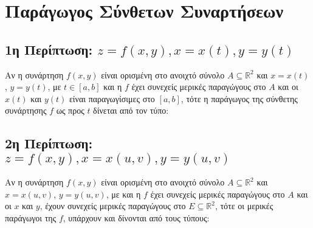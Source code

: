 \chapter{Παράγωγος Σύνθετων Συναρτήσεων}

\section{1η Περίπτωση: \ensuremath{z=f(x,y),  x=x(t),  y=y(t)}} 

\begin{thm}
  Αν η συνάρτηση $ f(x,y) $ είναι ορισμένη στο ανοιχτό σύνολο 
  $ A \subseteq \mathbb{R}^{2} $ και $ x = x(t) $, $ y=y(t) $, με 
  $ t \in [a,b] $ και η $f$ έχει συνεχείς μερικές 
  παραγώγους στο $A$ και οι $ x(t) $ και $ y(t) $ είναι παραγωγίσιμες στο 
  $ [a,b] $, τότε η παράγωγος της σύνθετης συνάρτησης $f$ ως προς $t$ δίνεται από 
  τον τύπο:

\end{thm}

\section{2η Περίπτωση: \ensuremath{z=f(x,y),  x=x(u,v),  y=y(u,v)}} 

\begin{thm}
  Αν η συνάρτηση $ f(x,y) $ είναι ορισμένη στο ανοιχτό σύνολο 
  $ A \subseteq \mathbb{R}^{2} $ και $ x = x(u,v) $, $ y=y(u,v) $, με 
  και η $f$ έχει συνεχείς μερικές παραγώγους στο $A$ και οι $ x $ και $ y $, έχουν 
  συνεχείς μερικές παραγώγους στο $ E \subseteq \mathbb{R}^{2} $,
  τότε οι μερικές παράγωγοι της $f$, υπάρχουν και δίνονται από τους τύπους:
\end{thm}

